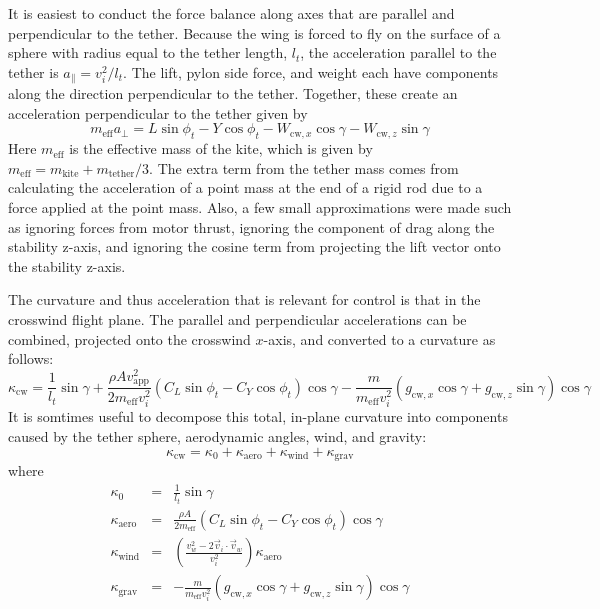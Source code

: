 \documentclass{article} %
\newcommand{\eff}{\mathrm{eff}}
\newcommand{\app}{\mathrm{app}}
\newcommand{\wind}{\mathrm{wind}}
\newcommand{\grav}{\mathrm{grav}}
\newcommand{\kite}{\mathrm{kite}}
\newcommand{\aero}{\mathrm{aero}}
\newcommand{\cw}{\mathrm{cw}}
\begin{document}
It is easiest to conduct the force balance along axes that are
parallel and perpendicular to the tether.  Because the wing is forced
to fly on the surface of a sphere with radius equal to the tether
length, $l_t$, the acceleration parallel to the tether is
$a_{\parallel} = v_i^2/l_t$.  The lift, pylon side force, and weight
each have components along the direction perpendicular to the tether.
Together, these create an acceleration perpendicular to the tether
given by
\begin{equation}
m_{\eff} a_{\bot} = L \sin \phi_t - Y \cos \phi_t -
W_{\cw, x} \cos \gamma - W_{\cw, z} \sin \gamma
\end{equation}
Here $m_{\eff}$ is the effective mass of the kite, which is given by
$m_{\eff} = m_{\kite} + m_{\mathrm{tether}} / 3$.  The extra term from
the tether mass comes from calculating the acceleration of a point
mass at the end of a rigid rod due to a force applied at the point
mass.  Also, a few small approximations were made such as ignoring
forces from motor thrust, ignoring the component of drag along the
stability z-axis, and ignoring the cosine term from projecting the
lift vector onto the stability z-axis.

The curvature and thus acceleration that is relevant for control is
that in the crosswind flight plane.  The parallel and perpendicular
accelerations can be combined, projected onto the crosswind $x$-axis,
and converted to a curvature as follows:
\begin{equation}
\kappa_{\cw} = \frac{1}{l_t} \sin \gamma +
\frac{\rho A v_{\app}^2}{2 m_{\eff} v_i^2}
\left(C_L \sin \phi_t - C_Y \cos \phi_t \right) \cos \gamma -
\frac{m}{m_{\eff} v_i^2}
(g_{\cw,x} \cos \gamma + g_{\cw,z} \sin \gamma) \cos \gamma
\end{equation}
%
It is somtimes useful to decompose this total, in-plane curvature into
components caused by the tether sphere, aerodynamic angles, wind, and
gravity:
\begin{equation}
\kappa_{\cw} = \kappa_0 + \kappa_{\aero} + \kappa_{\wind} + \kappa_{\grav}
\end{equation}
%
where
%
\begin{eqnarray}
\kappa_0 &=& \frac{1}{l_t} \sin \gamma \\
\kappa_{\aero} &=&
\frac{\rho A}{2 m_{\eff}} \left(C_L \sin \phi_t - C_Y \cos \phi_t \right) \cos \gamma \\
\kappa_{\wind} &=&
\left( \frac{v_w^2 - 2 \vec{v}_i \cdot \vec{v}_w}{v_i^2} \right) \kappa_{\aero} \\
\kappa_{\grav} &=&
-\frac{m}{m_{\eff} v_i^2}
(g_{\cw,x} \cos \gamma + g_{\cw,z} \sin \gamma) \cos \gamma
\end{eqnarray}
\end{document}
